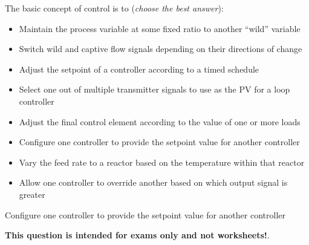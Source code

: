 

The basic concept of  control is to ({\it choose the best answer}):

\begin{itemize}
\item{} Maintain the process variable at some fixed ratio to another ``wild'' variable
\vskip 5pt 
\item{} Switch wild and captive flow signals depending on their directions of change
\vskip 5pt 
\item{} Adjust the setpoint of a controller according to a timed schedule 
\vskip 5pt 
\item{} Select one out of multiple transmitter signals to use as the PV for a loop controller
\vskip 5pt 
\item{} Adjust the final control element according to the value of one or more loads
\vskip 5pt 
\item{} Configure one controller to provide the setpoint value for another controller
\vskip 5pt 
\item{} Vary the feed rate to a reactor based on the temperature within that reactor
\vskip 5pt 
\item{} Allow one controller to override another based on which output signal is greater 
\end{itemize}







Configure one controller to provide the setpoint value for another controller







{\bf This question is intended for exams only and not worksheets!}.



